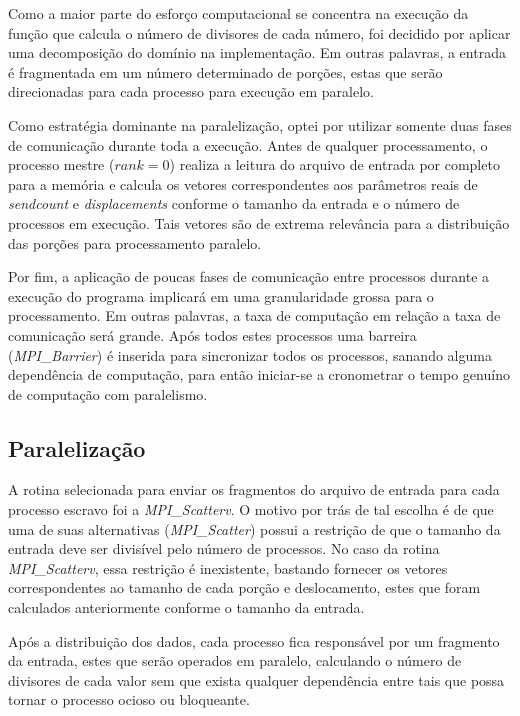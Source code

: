 \documentclass[a4paper, 12pt]{article}
\begin{document}
Como a maior parte do esforço computacional se concentra na execução da função que calcula o número de divisores de cada número, foi decidido por aplicar uma decomposição do domínio na implementação. Em outras palavras, a entrada é fragmentada em um número determinado de porções, estas que serão direcionadas para cada processo para execução em paralelo.

Como estratégia dominante na paralelização, optei por utilizar somente duas fases de comunicação durante toda a execução. Antes de qualquer processamento, o processo mestre (\(rank = 0\)) realiza a leitura do arquivo de entrada por completo para a memória e calcula os vetores correspondentes aos parâmetros reais de \emph{sendcount} e \emph{displacements} conforme o tamanho da entrada e o número de processos em execução. Tais vetores são de extrema relevância para a distribuição das porções para processamento paralelo.

Por fim, a aplicação de poucas fases de comunicação entre processos durante a execução do programa implicará em uma granularidade grossa para o processamento. Em outras palavras, a taxa de computação em relação a taxa de comunicação será grande. Após todos estes processos uma barreira (\emph{MPI\_Barrier}) é inserida para sincronizar todos os processos, sanando alguma dependência de computação, para então iniciar-se a cronometrar o tempo genuíno de computação com paralelismo. 

\subsection{Paralelização}

A rotina selecionada para enviar os fragmentos do arquivo de entrada para cada processo escravo foi a \emph{MPI\_Scatterv}. O motivo por trás de tal escolha é de que uma de suas alternativas (\emph{MPI\_Scatter}) possui a restrição de que o tamanho da entrada deve ser divisível pelo número de processos. No caso da rotina \emph{MPI\_Scatterv}, essa restrição é inexistente, bastando fornecer os vetores correspondentes ao tamanho de cada porção e deslocamento, estes que foram calculados anteriormente conforme o tamanho da entrada.

Após a distribuição dos dados, cada processo fica responsável por um fragmento da entrada, estes que serão operados em paralelo, calculando o número de divisores de cada valor sem que exista qualquer dependência entre tais que possa tornar o processo ocioso ou bloqueante.
\end{document}
